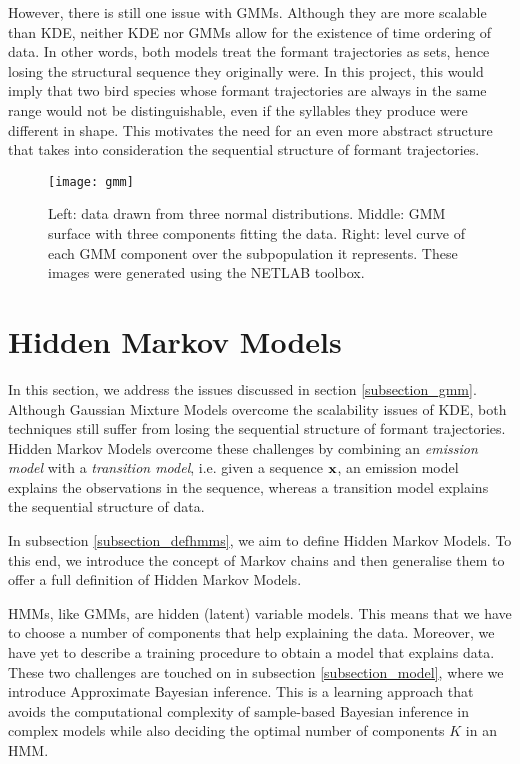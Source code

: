 \documentclass[../main.tex]{subfiles}
\begin{document}
\par However, there is still one issue with GMMs. Although they are more scalable than KDE, neither KDE nor GMMs allow for the existence of time ordering of data. In other words, both models treat the formant trajectories as sets, hence losing the structural sequence they originally were. In this project, this would imply that two bird species whose formant trajectories are always in the same range would not be distinguishable, even if the syllables they produce were different in shape. This motivates the need for an even more abstract structure that takes into consideration the sequential structure of formant trajectories.

\begin{figure}[t]
\centering
\texttt{[image: gmm]}
\caption{Left: data drawn from three normal distributions. Middle: GMM surface with three components fitting the data. Right: level curve of each GMM component over the subpopulation it represents. These images were generated using the NETLAB toolbox.}
\label{fig_gmm}
\end{figure}

\section{Hidden Markov Models} \label{section_hmm}
In this section, we address the issues discussed in section \ref{subsection_gmm}. Although Gaussian Mixture Models overcome the scalability issues of KDE, both techniques still suffer from losing the sequential structure of formant trajectories. Hidden Markov Models overcome these challenges by combining an \emph{emission model} with a \emph{transition model}, i.e. given a sequence $\mathbf{x}$, an emission model explains the observations in the sequence, whereas a transition model explains the sequential structure of data. 
\par In subsection \ref{subsection_defhmms}, we aim to define Hidden Markov Models. To this end, we introduce the concept of Markov chains and then generalise them to offer a full definition of Hidden Markov Models.
\par HMMs, like GMMs, are hidden (latent) variable models. This means that we have to choose a number of components that help explaining the data. Moreover, we have yet to describe a training procedure to obtain a model that explains data. These two challenges are touched on in subsection \ref{subsection_model}, where we introduce Approximate Bayesian inference. This is a learning approach that avoids the computational complexity of sample-based Bayesian inference in complex models while also deciding the optimal number of components $K$ in an HMM.
\end{document}
